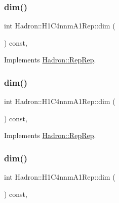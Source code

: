\subsubsection{\texorpdfstring{dim()}{dim()}\hspace{0.1cm}{\footnotesize\ttfamily [3/5]}}
{\footnotesize\ttfamily int Hadron\+::\+H1\+C4nnm\+A1\+Rep\+::dim (\begin{DoxyParamCaption}{ }\end{DoxyParamCaption}) const\hspace{0.3cm}{\ttfamily [inline]}, {\ttfamily [virtual]}}



Implements \mbox{\hyperlink{structHadron_1_1RepRep_a92c8802e5ed7afd7da43ccfd5b7cd92b}{Hadron\+::\+Rep\+Rep}}.

\mbox{\label{structHadron_1_1H1C4nnmA1Rep_a9a5bd4bd14a8dc6d5eeb39b67b005087}} 
\subsubsection{\texorpdfstring{dim()}{dim()}\hspace{0.1cm}{\footnotesize\ttfamily [4/5]}}
{\footnotesize\ttfamily int Hadron\+::\+H1\+C4nnm\+A1\+Rep\+::dim (\begin{DoxyParamCaption}{ }\end{DoxyParamCaption}) const\hspace{0.3cm}{\ttfamily [inline]}, {\ttfamily [virtual]}}



Implements \mbox{\hyperlink{structHadron_1_1RepRep_a92c8802e5ed7afd7da43ccfd5b7cd92b}{Hadron\+::\+Rep\+Rep}}.

\mbox{\label{structHadron_1_1H1C4nnmA1Rep_a9a5bd4bd14a8dc6d5eeb39b67b005087}} 
\subsubsection{\texorpdfstring{dim()}{dim()}\hspace{0.1cm}{\footnotesize\ttfamily [5/5]}}
{\footnotesize\ttfamily int Hadron\+::\+H1\+C4nnm\+A1\+Rep\+::dim (\begin{DoxyParamCaption}{ }\end{DoxyParamCaption}) const\hspace{0.3cm}{\ttfamily [inline]}, {\ttfamily [virtual]}}



